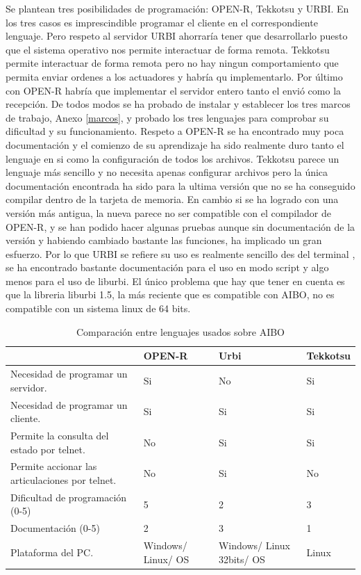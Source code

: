 \documentclass[12pt,a4paper,final,twoside]{article}
\begin{document}
Se plantean tres posibilidades de programación: OPEN-R, Tekkotsu y URBI.
En los tres casos es imprescindible programar el cliente en el correspondiente lenguaje. Pero respeto al servidor URBI ahorraría tener que desarrollarlo puesto que el sistema operativo nos permite interactuar de forma remota. Tekkotsu permite interactuar de forma remota pero no hay ningun comportamiento que permita enviar ordenes a los actuadores y habría qu implementarlo. Por último con OPEN-R habría que implementar el servidor entero tanto el envió como la recepción. 
De todos modos se ha probado de instalar y establecer los tres marcos de trabajo, Anexo \ref{marcos}, y probado los tres lenguajes para comprobar su dificultad y su funcionamiento. Respeto a OPEN-R se ha encontrado muy poca documentación y el comienzo de su aprendizaje ha sido realmente duro tanto el lenguaje en si como la configuración de todos los archivos. Tekkotsu parece un lenguaje más sencillo y no necesita apenas configurar archivos pero la única documentación encontrada ha sido para la ultima versión que no se ha conseguido compilar dentro de la tarjeta de memoria. En cambio si se ha logrado con una versión más antigua, la nueva parece no ser compatible con el compilador de OPEN-R, y se han podido hacer algunas pruebas aunque sin documentación de la versión y habiendo cambiado bastante las funciones, ha implicado un gran esfuerzo. 
Por lo que URBI se refiere su uso es realmente sencillo des del terminal , se ha encontrado bastante documentación para el uso en modo script y algo menos para el uso de liburbi. El único problema que hay que tener en cuenta es que la libreria liburbi 1.5, la más reciente que es compatible con  AIBO, no es compatible con un sistema linux de 64 bits. 

\begin{table}[H]
\begin{center}
\begin{tabulary}{\textwidth}{|p{5cm}|p{2.5cm}|p{2.5cm}|p{2.5cm}|}
\hline

& \textbf{OPEN-R}
& \textbf{Urbi} 
& \textbf{Tekkotsu} \\\hline
Necesidad de programar un servidor.
& Si
& No
& Si \\ \hline
Necesidad de programar un cliente.
& Si
& Si
& Si\\ \hline
Permite la consulta del estado por telnet.
& No
& Si
& Si\\ \hline
Permite accionar las articulaciones por telnet.
& No
& Si
& No\\ \hline
Dificultad de programación (0-5)
& 5
& 2 
& 3\\ \hline
Documentación (0-5)
& 2
& 3
& 1\\ \hline
Plataforma del PC.
& Windows/ Linux/ OS
& Windows/ Linux 32bits/ OS
& Linux\\ \hline
\end{tabulary}
\end{center}
\caption{Comparación entre lenguajes usados sobre AIBO\label{complleng}}
\end{table}
\end{document}
